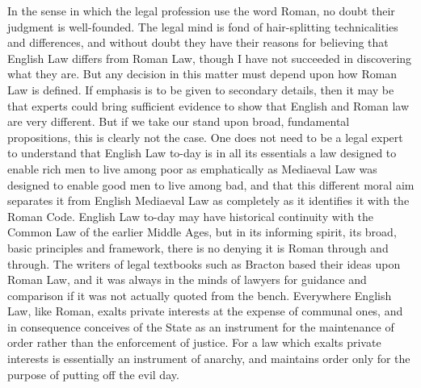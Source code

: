 \documentclass{book}
\begin{document}
In the sense in which the legal profession use the word Roman, no doubt their judgment is well-founded. The legal mind is fond of hair-splitting technicalities and differences, and without doubt they have their reasons for believing that English Law differs from Roman Law, though I have not succeeded in discovering what they are. But any decision in this matter must depend upon how Roman Law is defined. If emphasis is to be given to secondary details, then it may be that experts could bring sufficient evidence to show that English and Roman law are very different. But if we take our stand upon broad, fundamental propositions, this is clearly not the case. One does not need to be a legal expert to understand that English Law to-day is in all its essentials a law designed to enable rich men to live among poor as emphatically as Mediaeval Law was designed to enable good men to live among bad, and that this different moral aim separates it from English Mediaeval Law as completely as it identifies it with the Roman Code. English Law to-day may have historical continuity with the Common Law of the earlier Middle Ages, but in its informing spirit, its broad, basic principles and framework, there is no denying it is Roman through and through. The writers of legal textbooks such as Bracton based their ideas upon Roman Law, and it was always in the minds of lawyers for guidance and comparison if it was not actually quoted from the bench. Everywhere English Law, like Roman, exalts private interests at the expense of communal ones, and in consequence conceives of the State as an instrument for the maintenance of order rather than the enforcement of justice. For a law which exalts private interests is essentially an instrument of anarchy, and maintains order only for the purpose of putting off the evil day.\footnotemark[1]
\end{document}
